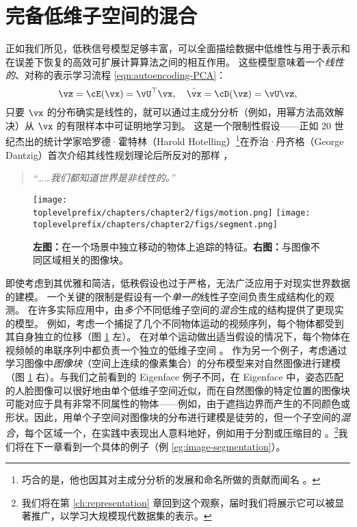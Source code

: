 \documentclass[../../book-main.tex]{subfiles}
\begin{document}
\section{完备低维子空间的混合}%
\label{sec:ica}
正如我们所见，低秩信号模型足够丰富，可以全面描绘数据中低维性与用于表示和在误差下恢复的高效可扩展计算算法之间的相互作用。
这些模型意味着一个\textit{线性的}、对称的表示学习流程 \eqref{eqn:autoencoding-PCA}：
\begin{equation*}
    \vz = \cE(\vx) = \vU^\top \vx, \quad \hat{\vx} = \cD(\vz) = \vU \vz,
\end{equation*}
只要 $\vx$ 的分布确实是线性的，就可以通过主成分分析（例如，用幂方法高效解决）从 $\vx$ 的有限样本中可证明地学习到。
这是一个限制性假设——正如 20 世纪杰出的统计学家哈罗德·霍特林（Harold Hotelling）\footnote{巧合的是，他也因其对主成分分析的发展和命名所做的贡献而闻名 \cite{Hotelling1933}。}在乔治·丹齐格（George Dantzig）首次介绍其线性规划理论后所反对的那样 \cite{Dantzig2002-eh}，
\begin{quote}
\centering
    \textit{“……我们都知道世界是非线性的。”}
\end{quote}


\begin{figure}
    \centering
    \texttt{[image: \\toplevelprefix/chapters/chapter2/figs/motion.png]} \hspace{5mm}
    \texttt{[image: \\toplevelprefix/chapters/chapter2/figs/segment.png]} 
    \caption{\textbf{左图：}在一个场景中独立移动的物体上追踪的特征。\textbf{右图：}与图像不同区域相关的图像块。}
    \label{fig:multiple-subspaces}
\end{figure}
即使考虑到其优雅和简洁，低秩假设也过于严格，无法广泛应用于对现实世界数据的建模。
一个关键的限制是假设有一个\textit{单一的}线性子空间负责生成结构化的观测。
在许多实际应用中，由\textit{多个}不同低维子空间的\textit{混合}生成的结构提供了更现实的模型。
例如，考虑一个捕捉了几个不同物体运动的视频序列，每个物体都受到其自身独立的位移（图 \ref{fig:multiple-subspaces} 左）。
在对单个运动做出适当假设的情况下，每个物体在视频帧的串联序列中都负责一个独立的低维子空间 \cite{VidalR2004-ECCV}。
作为另一个例子，考虑通过学习图像中\textit{图像块}（空间上连续的像素集合）的分布模型来对自然图像进行建模（图 \ref{fig:multiple-subspaces} 右）。与我们之前看到的 Eigenface 例子不同，在 Eigenface 中，姿态匹配的人脸图像可以很好地由单个低维子空间近似，而在自然图像的特定位置的图像块可能对应于具有非常不同属性的物体——例如，由于遮挡边界而产生的不同颜色或形状。因此，用单个子空间对图像块的分布进行建模是徒劳的，但一个子空间的\textit{混合}，每个区域一个，在实践中表现出人意料地好，例如用于分割或压缩目的 \cite{Mobahi-IJCV2011}。\footnote{我们将在第 \ref{ch:representation} 章回到这个观察，届时我们将展示它可以被显著推广，以学习大规模现代数据集的表示。}我们将在下一章看到一个具体的例子（例 \ref{eg:image-segmentation}）。
\end{document}
